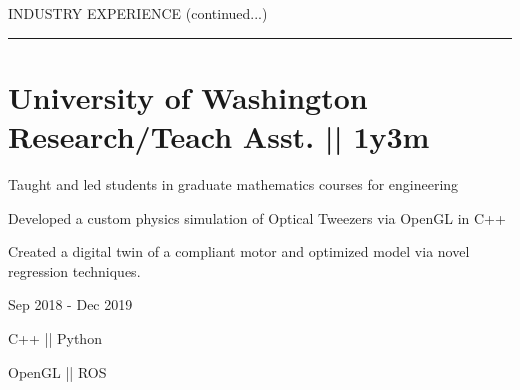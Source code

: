 \section{}{}

{\hspace{-1.72in}\noindent\color{cblue} INDUSTRY EXPERIENCE (continued...)}

\vspace{5ex}



\vspace{-6.5ex}
{\hspace{-1.73in}\noindent\color{dblue}\rule{6.935in}{0.4pt}} %
\vspace{-3.4ex}




\section
{\textbf{University of Washington} \newline
Research/Teach Asst. || 1y3m}{}


\begin{detail}
\vspace{-2.5ex}
\BulletItem
Taught and led students in graduate mathematics courses for engineering

\BulletItem
Developed a custom physics simulation of Optical Tweezers via OpenGL in C++

\BulletItem
Created a digital twin of a compliant motor and optimized model via novel regression techniques. 
\end{detail}


\begin{subtitle}
\vspace{-10.8ex}
{{Sep 2018 - Dec 2019}} 
\end{subtitle}

\vspace{3ex} 
{\color{cyan}\small {C++ || Python}}

{
\vspace{-2.5ex}\hspace{3.17in} \color{cyan} \small
{OpenGL || ROS} }
\vspace{1ex}




